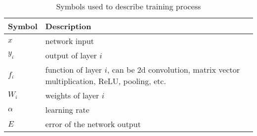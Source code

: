 \begin{table}[htbp]
    \centering
    \caption{Symbols used to describe training process}
      \begin{tabular}{lp{}} \hline
      Symbol   & Description \\ \hline
      $x$      & network input \\
      $y_i$    & output of layer $i$ \\
      $f_i$    & function of layer $i$, can be 2d convolution, matrix vector multiplication, ReLU, pooling, etc. \\
      $W_i$    & weights of layer $i$ \\
      $\alpha$ & learning rate \\
      $E$      & error of the network output \\ \hline
      \end{tabular}%
    \label{tab:symbol}%
  \end{table}%